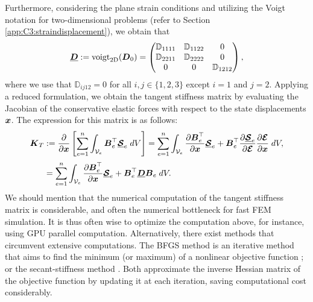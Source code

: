 %
Furthermore, considering the plane strain conditions and utilizing the Voigt notation for two-dimensional problems (refer to Section \ref{app:C3:straindisplacement}), we obtain that
%
\begin{equation}
\underline{{\boldsymbol{D}}} := \textrm{voigt}_{\textrm{2D}}({\boldsymbol{D}}_0) = \begin{pmatrix}
\mathbb{D}_{1111} & \mathbb{D}_{1122} & 0 \\
\mathbb{D}_{2211} & \mathbb{D}_{2222} & 0 \\
0 & 0 & \mathbb{D}_{1212} 
\end{pmatrix},
\end{equation}
where we use that $\mathbb{D}_{ij12} = 0$ for all $i,j \in \{1,2,3\}$ except $i=1$ and $j=2$. Applying a reduced formulation, we obtain the tangent stiffness matrix by evaluating the Jacobian of the conservative elastic forces with respect to the state displacements ${\boldsymbol{x}}$. The expression for this matrix is as follows:
%
\begin{align}
{\boldsymbol{K}}_T & := \frac{\partial}{\partial {\boldsymbol{x}}}  \left[ \sum_{e=1}^{n} \int_{\mathcal{V}_e} {\boldsymbol{B}}_e^\top \underline{\boldsymbol{\mathcal{S}}}_e \; dV \right] = \sum_{e=1}^{n} \int_{\mathcal{V}_e} \frac{\partial {\boldsymbol{B}}_e^\top}{\partial {\boldsymbol{x}}} \underline{\boldsymbol{\mathcal{S}}}_e +  {\boldsymbol{B}}_e^\top \frac{\partial \underline{\boldsymbol{\mathcal{S}}}_e}{\partial \boldsymbol{\mathcal{E}}} \frac{\partial \boldsymbol{\mathcal{E}}}{\partial {\boldsymbol{x}}} \; dV, \notag \\[0.25em]
& = \sum_{e=1}^{n} \int_{\mathcal{V}_e} \frac{\partial {\boldsymbol{B}}_e^\top}{\partial {\boldsymbol{x}}} \underline{\boldsymbol{\mathcal{S}}}_e +  {\boldsymbol{B}}_e^\top \underline{{\boldsymbol{D}}} {\boldsymbol{B}}_e \; dV.
\end{align}
%
We should mention that the numerical computation of the tangent stiffness matrix is considerable, and often the numerical bottleneck for fast FEM simulation. It is thus often wise to optimize the computation above, for instance, using GPU parallel computation. Alternatively, there exist methods that circumvent extensive computations. The BFGS method is an iterative method that aims to find the minimum (or maximum) of a nonlinear objective function \cite{Holzapfel2002}; or the secant-stiffness method \cite{Kim2018}. Both approximate the inverse Hessian matrix of the objective function by updating it at each iteration, saving computational cost considerably. 